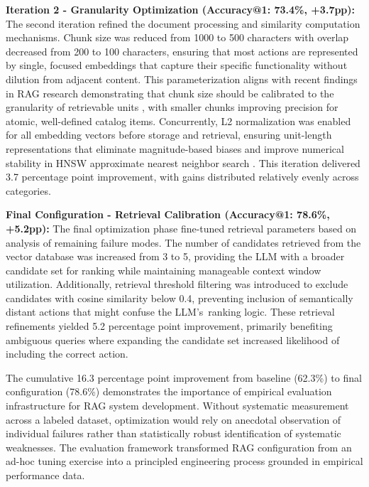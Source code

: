 \textbf{Iteration 2 - Granularity Optimization (Accuracy@1: 73.4\%, +3.7pp):} The second iteration refined the document processing and similarity computation mechanisms. Chunk size was reduced from 1000 to 500 characters with overlap decreased from 200 to 100 characters, ensuring that most actions are represented by single, focused embeddings that capture their specific functionality without dilution from adjacent content. This parameterization aligns with recent findings in RAG research demonstrating that chunk size should be calibrated to the granularity of retrievable units \cite{juvekar2024introducingnewhyperparameterrag}, with smaller chunks improving precision for atomic, well-defined catalog items. Concurrently, L2 normalization was enabled for all embedding vectors before storage and retrieval, ensuring unit-length representations that eliminate magnitude-based biases and improve numerical stability in HNSW approximate nearest neighbor search \cite{malkov2018efficientrobustapproximatenearest}. This iteration delivered 3.7 percentage point improvement, with gains distributed relatively evenly across categories.

\textbf{Final Configuration - Retrieval Calibration (Accuracy@1: 78.6\%, +5.2pp):} The final optimization phase fine-tuned retrieval parameters based on analysis of remaining failure modes. The number of candidates retrieved from the vector database was increased from 3 to 5, providing the LLM with a broader candidate set for ranking while maintaining manageable context window utilization. Additionally, retrieval threshold filtering was introduced to exclude candidates with cosine similarity below 0.4, preventing inclusion of semantically distant actions that might confuse the LLM's~ranking logic. These retrieval refinements yielded 5.2 percentage point improvement, primarily benefiting ambiguous queries where expanding the candidate set increased likelihood of including the correct action.

The cumulative 16.3 percentage point improvement from baseline (62.3\%) to final configuration (78.6\%) demonstrates the importance of empirical evaluation infrastructure for RAG system development. Without systematic measurement across a labeled dataset, optimization would rely on anecdotal observation of individual failures rather than statistically robust identification of systematic weaknesses. The evaluation framework transformed RAG configuration from an ad-hoc tuning exercise into a principled engineering process grounded in empirical performance data.

